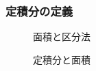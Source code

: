 \documentclass[twocolumn,11pt]{jarticle}
\begin{document}
\subsubsection{定積分の定義}
\begin{figure}[h]
  \begin{center}
    \caption{\label{fig:SbySum}
      面積と区分法}
  \end{center}
\end{figure}
\begin{figure}[h]
  \begin{center}
    \caption{\label{fig:integration}
      定積分と面積}
  \end{center}
\end{figure}

\end{document}
